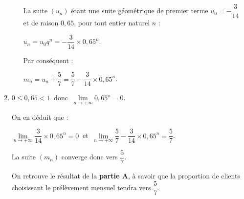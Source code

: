 \begin{corrige}
\begin{enumerate}
\begin{enumerate}[label=\alph*.]
          La suite $(u_n)$ étant une suite géométrique de premier terme ${u_0=-\dfrac{3}{14}}$ et de raison $0,65$, pour tout entier naturel $n$ :
          \par
          $u_n=u_0q^n=-\dfrac{3}{14} \times 0,65^n$.
          \par
          Par conséquent :
          \par
          $m_{n}= u_n + \dfrac{5}{7}=\dfrac{5}{7}-\dfrac{3}{14} \times 0,65^n$.
          \par
     \end{enumerate}
     \item %
     ${0 \leqslant 0,65 < 1}\ $ donc $\ \lim\limits_{n \rightarrow +\infty } 0,65^n = 0$.
     \par
     On en déduit que :
     \par
     $\lim\limits_{n \rightarrow +\infty}\dfrac{3}{14} \times 0,65^n = 0\ $ et $\ \lim\limits_{n \rightarrow +\infty}\dfrac{5}{7}-\dfrac{3}{14} \times 0,65^n = \dfrac{5}{7}$.
     \par
     La suite $(m_n)$ converge donc vers $\dfrac{5}{7}$.
     \par
     On retrouve le résultat de la \textbf{partie A}, à savoir que la proportion de clients choisissant le prélèvement mensuel tendra vers $\dfrac{5}{7}$.
\end{enumerate}
\end{corrige}
